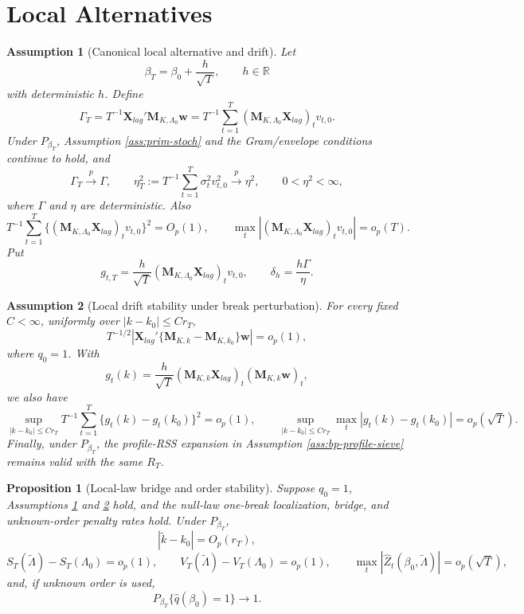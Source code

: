 \documentclass[12pt]{article}
\numberwithin{equation}{section}
\newtheorem{proposition}{Proposition}
\newtheorem{assumption}{Assumption}
\theoremstyle{definition}
\newcommand{\R}{\mathbb R}
\begin{document}
\section{Local Alternatives}
\label{sec:local-alternatives}

\begin{assumption}[Canonical local alternative and drift]
\label{ass:wb-local-oracle}
Let
\[
    \beta_T=\beta_0+\frac{h}{\sqrt T},
    \qquad h\in\R
\]
with deterministic \(h\).  Define
\[
    \Gamma_T
    =T^{-1}\bm X_{lag}'\bm M_{K,\Lambda_0}\bm w
    =T^{-1}\sum_{t=1}^T
      (\bm M_{K,\Lambda_0}\bm X_{lag})_t v_{t,0}.
\]
Under \(P_{\beta_T}\), Assumption \ref{ass:prim-stoch} and the Gram/envelope
conditions continue to hold, and
\[
    \Gamma_T\xrightarrow{p}\Gamma,
    \qquad
    \eta_T^2:=T^{-1}\sum_{t=1}^T\sigma_t^2v_{t,0}^2
    \xrightarrow{p}\eta^2,
    \qquad
    0<\eta^2<\infty,
\]
where \(\Gamma\) and \(\eta\) are deterministic.  Also
\[
    T^{-1}\sum_{t=1}^T
    \{(\bm M_{K,\Lambda_0}\bm X_{lag})_t v_{t,0}\}^2=O_p(1),
    \qquad
    \max_t |(\bm M_{K,\Lambda_0}\bm X_{lag})_t v_{t,0}|=o_p(T).
\]
Put
\[
    g_{t,T}=\frac{h}{\sqrt T}
    (\bm M_{K,\Lambda_0}\bm X_{lag})_t v_{t,0},
    \qquad
    \delta_h=\frac{h\Gamma}{\eta}.
\]
\end{assumption}

\begin{assumption}[Local drift stability under break perturbation]
\label{ass:local-drift-stability}
For every fixed \(C<\infty\), uniformly over \(|k-k_0|\leq Cr_T\),
\[
    T^{-1/2}\left|
    \bm X_{lag}'\{\bm M_{K,k}-\bm M_{K,k_0}\}\bm w
    \right|=o_p(1),
\]
where \(q_0=1\).  With
\[
    g_t(k)=\frac{h}{\sqrt T}(\bm M_{K,k}\bm X_{lag})_t
           (\bm M_{K,k}\bm w)_t,
\]
we also have
\[
    \sup_{|k-k_0|\leq Cr_T}
    T^{-1}\sum_{t=1}^T\{g_t(k)-g_t(k_0)\}^2=o_p(1),
    \qquad
    \sup_{|k-k_0|\leq Cr_T}
    \max_t|g_t(k)-g_t(k_0)|=o_p(\sqrt T).
\]
Finally, under \(P_{\beta_T}\), the profile-RSS expansion in Assumption
\ref{ass:bp-profile-sieve} remains valid with the same \(R_T\).
\end{assumption}

\begin{proposition}[Local-law bridge and order stability]
\label{prop:local-law-stability}
Suppose \(q_0=1\), Assumptions \ref{ass:wb-local-oracle} and
\ref{ass:local-drift-stability} hold, and the null-law one-break localization,
bridge, and unknown-order penalty rates hold.  Under \(P_{\beta_T}\),
\[
    |\widetilde k-k_0|=O_p(r_T),
\]
\[
    S_T(\widetilde\Lambda)-S_T(\Lambda_0)=o_p(1),
    \qquad
    V_T(\widetilde\Lambda)-V_T(\Lambda_0)=o_p(1),
    \qquad
    \max_t|\widehat Z_t(\beta_0,\widetilde\Lambda)|=o_p(\sqrt T),
\]
and, if unknown order is used,
\[
    P_{\beta_T}\{\widehat q(\beta_0)=1\}\to1.
\]
\end{proposition}
\end{document}
